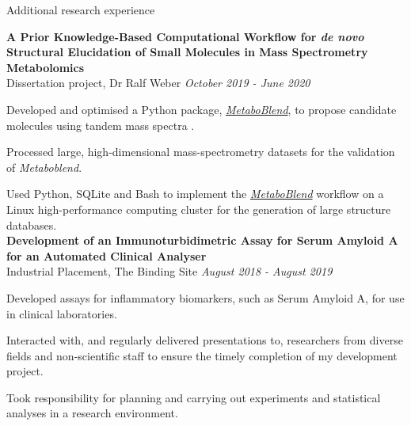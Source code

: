 \documentclass{resume}
\begin{document}
\begin{rSection}{Additional research experience}

\vspace{1pt plus 1pt}
\textbf{A Prior Knowledge-Based Computational Workflow for \textit{de novo} Structural Elucidation of Small Molecules in Mass Spectrometry Metabolomics} \\
Dissertation project, Dr Ralf Weber \hfill  \textit{October 2019 - June 2020}

\vspace{2pt plus 1pt minus 1pt}
\item Developed and optimised a Python package, \href{https://github.com/computational-metabolomics/metaboblend/tree/dev}{\textit{MetaboBlend}}, to propose candidate molecules using tandem mass spectra . 
\item Processed large, high-dimensional mass-spectrometry datasets for the validation of \textit{Metaboblend}. 
\item Used Python, SQLite and Bash to implement the \href{https://github.com/computational-metabolomics/metaboblend/tree/dev}{\textit{MetaboBlend}} workflow on a Linux high-performance computing cluster for the generation of large structure databases. \\

\textbf{Development of an Immunoturbidimetric Assay for Serum Amyloid A for an Automated Clinical Analyser} \\
Industrial Placement, The Binding Site \hfill  \textit{August 2018 - August 2019}

\vspace{2pt plus 1pt minus 1pt}
\item Developed assays for inflammatory biomarkers, such as Serum Amyloid A, for use in clinical laboratories.
\item Interacted with, and regularly delivered presentations to, researchers from diverse fields and non-scientific staff to ensure the timely completion of my development project. 
\item Took responsibility for planning and carrying out experiments and statistical analyses in a research environment.

\end{rSection}
\end{document}
